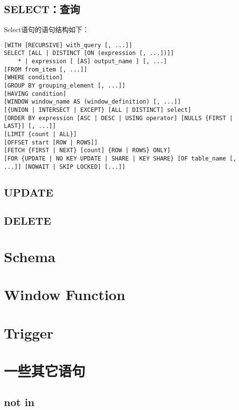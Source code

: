 \documentclass[12pt,a4paper,UTF8]{ctexbook}
\theoremstyle{plain}
\begin{document}
\subsection{SELECT：查询} 
Select语句的语句结构如下： 
\begin{lstlisting} 
[WITH [RECURSIVE] with_query [, ...]]
SELECT [ALL | DISTINCT [ON (expression [, ...])]]
    * | expression [ [AS] output_name ] [, ...]
[FROM from_item [, ...]]
[WHERE condition]
[GROUP BY grouping_element [, ...]]
[HAVING condition]
[WINDOW window_name AS (window_definition) [, ...]]
[{UNION | INTERSECT | EXCEPT} [ALL | DISTINCT] select]
[ORDER BY expression [ASC | DESC | USING operator] [NULLS {FIRST | LAST}] [, ...]]
[LIMIT {count | ALL}]
[OFFSET start [ROW | ROWS]]
[FETCH {FIRST | NEXT} [count] {ROW | ROWS} ONLY]
[FOR {UPDATE | NO KEY UPDATE | SHARE | KEY SHARE} [OF table_name [, ...]] [NOWAIT | SKIP LOCKED] [...]]
\end{lstlisting}

\subsection{UPDATE} 

\subsection{DELETE}

\section{Schema}

\section{Window Function} 

\section{Trigger} 

\section{一些其它语句} 
\subsection{not in} 
\end{document}
